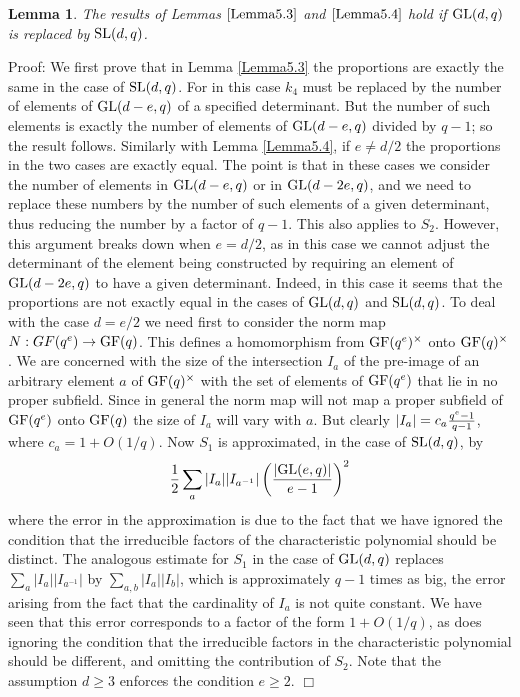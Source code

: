 \documentclass[12pt]{article}
\newtheorem{lemma}[definition]{Lemma}
\newenvironment{proof}{\normalsize {\sc Proof}:}{{\hfill $\Box$ \\}}
\def\SL{{\rm SL}}
\def\GL{{\rm GL}}
\def\GF{{\rm GF}}
\begin{document}
\begin{lemma}\label{Lemma5.5} The results of 
Lemmas $\ref{Lemma5.3}$ and $\ref{Lemma5.4}$ hold if $\GL(d,q)$
is replaced by $\SL(d,q)$. 
\end{lemma}
\begin{proof}
We first prove that in Lemma \ref{Lemma5.3} the proportions are exactly the same in
the case of $\SL(d,q)$.  For in this case $k_4$ must be replaced by
the number of elements of $\GL(d-e,q)$ of a specified determinant.
But the number of such elements is exactly the number of elements of
$\GL(d-e,q)$ divided by $q-1$; so the result follows.  Similarly with
Lemma \ref{Lemma5.4}, if $e\ne d/2$ the proportions in the two cases are exactly
equal.  The point is that in these cases we consider the number of
elements in $\GL(d-e,q)$ or in $\GL(d-2e,q)$, and we need to replace
these numbers by the number of such elements of a given determinant, thus
reducing the number by a factor of $q-1$.
This also applies to $S_2$.  However, this argument breaks down when
$e=d/2$, as in this case we cannot adjust the determinant of the
element being constructed by requiring an element of $\GL(d-2e,q)$
to have a given determinant.  Indeed, in this case it seems that
the proportions are not exactly equal in the cases of $\GL(d,q)$
and $\SL(d,q)$.
To deal with the case $d=e/2$ we need first to consider the norm
map $N:GF(q^e)\to\GF(q)$.  This defines a homomorphism from
$\GF(q^e)^\times$ onto $\GF(q)^\times$.  We are concerned with
the size of the intersection $I_a$ of the pre-image of an arbitrary
element $a$ of $\GF(q)^\times$ with the set of elements of $\GF(q^e)$
that lie in no proper subfield.  Since in general the norm map will
not map a proper subfield of $\GF(q^e)$ onto $\GF(q)$ the size of $I_a$
will vary with $a$.  But clearly $\vert I_a\vert=c_a{q^e-1
\over q-1}$, where $c_a=1+O(1/q)$.
Now $S_1$ is approximated, in the case of $\SL(d,q)$, by 
$${1\over2}\sum_a\vert I_a\vert\vert I_{a^{-1}}\vert\left({\vert\GL(e,q)\vert\over e-1}
\right)^2$$
where the error in the approximation is due to the fact that we have ignored the 
condition that the irreducible factors of the characteristic polynomial should be
distinct.  The analogous estimate for $S_1$ in the case of $\GL(d,q)$ replaces
$\sum_a\vert I_a\vert \vert I_{a^{-1}}\vert$ by $\sum_{a,b}\vert I_a\vert\vert I_b\vert$,
which is approximately $q-1$ times as big, the error arising from the fact that
the cardinality of $I_a$ is not quite constant.  We have seen that this error 
corresponds to a factor of the form $1+O(1/q)$, as does ignoring the condition
that the irreducible factors in the characteristic polynomial should be different,
and omitting the contribution of $S_2$.  Note that the assumption $d\ge 3$ enforces
the condition $e\ge 2$.
\end{proof}
\end{document}

